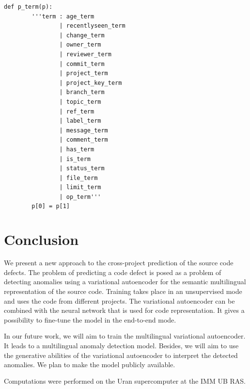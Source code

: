 \documentclass[conference]{ieeetran}
\begin{document}
\begin{verbatim}
def p_term(p):
        '''term : age_term
                | recentlyseen_term
                | change_term
                | owner_term
                | reviewer_term
                | commit_term
                | project_term
                | project_key_term
                | branch_term
                | topic_term
                | ref_term
                | label_term
                | message_term
                | comment_term
                | has_term
                | is_term
                | status_term
                | file_term
                | limit_term
                | op_term'''
        p[0] = p[1]
\end{verbatim}


\section{Conclusion}\label{conclusion}

We present a new approach to the cross-project prediction of the source code defects.
The problem of predicting a code defect is posed as a problem of detecting anomalies using a variational
 autoencoder for the semantic multilingual representation of the source code.
Training takes place in an unsupervised mode and uses the code from different projects.
The variational autoencoder can be combined with the neural network that is used for code representation.
It gives a possibility to fine-tune the model in the end-to-end mode.

In our future work, we will aim to train the multilingual variational autoencoder.
It leads to a multilingual anomaly detection model.
Besides, we will aim to use the generative abilities of the  variational autoencoder to interpret the detected anomalies.
We plan to make the model publicly available. 

Computations were performed on the Uran supercomputer at the IMM UB RAS.
\end{document}
